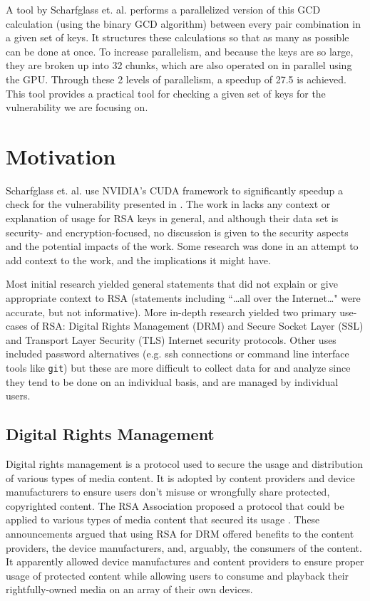 \documentclass[12pt]{ucthesis}
\begin{document}
A tool by Scharfglass et. al. \cite{scharfglass2012breaking} performs a
parallelized version of this GCD calculation (using the binary GCD algorithm)
between every pair combination in a given set of keys. It structures these
calculations so that as many as possible can be done at once. To increase
parallelism, and because the keys are so large, they are broken up into 32
chunks, which are also operated on in parallel using the GPU. Through these 2
levels of parallelism, a speedup of 27.5 is achieved. This tool provides a
practical tool for checking a given set of keys for the vulnerability we are
focusing on.

\section{Motivation}
Scharfglass et. al. use NVIDIA's CUDA framework to significantly speedup a
check for the vulnerability
presented in \cite{lenstra2012ron}. The work in \cite{scharfglass2012breaking}
lacks any context or explanation of usage for RSA keys in general, and although
their data set is security- and encryption-focused, no discussion is given to
the security aspects and the potential impacts of the work. Some research was
done in an attempt to add context to the work, and the implications it might
have.

Most initial research yielded general statements that did not explain or give
appropriate context to RSA (statements including ``\dots all over the
Internet\dots" were accurate, but not informative). More in-depth research
yielded two primary use-cases of RSA: Digital Rights Management (DRM) and
Secure Socket Layer (SSL) and Transport Layer Security (TLS) Internet
security protocols. Other uses included password alternatives (e.g. ssh
connections or command line interface tools like \texttt{git}) but these are
more difficult to collect data for and analyze since they tend to be done on
an individual basis, and are managed by individual users.

\subsection{Digital Rights Management}
Digital rights management is a protocol used to secure the usage and
distribution of various types of media content. It is adopted by content
providers and device manufacturers to ensure users don't misuse or wrongfully 
share protected, copyrighted content.
The RSA Association proposed a protocol that could be applied to various types
of media content that secured its usage \cite{rsa2004announces,
rsa2004supports}. These announcements argued that using RSA for DRM offered
benefits to the content providers, the device manufacturers, and, arguably, the
consumers of the content. It apparently allowed device manufactures and
content providers to ensure proper usage of protected content while allowing
users to consume and playback their rightfully-owned media on an array of
their own devices.
\end{document}
